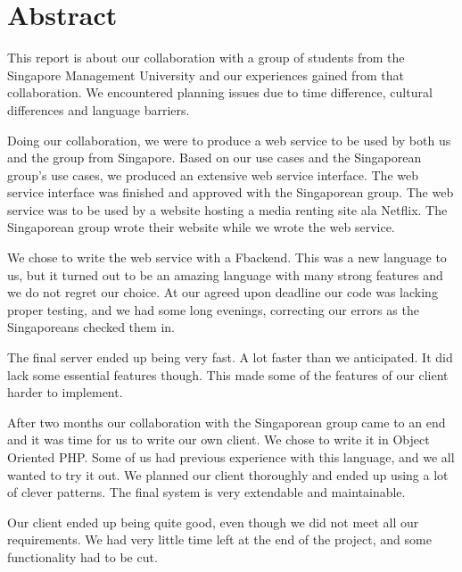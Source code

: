 \section*{Abstract}
This report is about our collaboration with a group of students from the Singapore Management University and our experiences gained from that collaboration. We encountered planning issues due to time difference, cultural differences and language barriers.

Doing our collaboration, we were to produce a web service to be used by both us and the group from Singapore. Based on our use cases and the Singaporean group's use cases, we produced an extensive web service interface. The web service interface was finished and approved with the Singaporean group.
The web service was to be used by a website hosting a media renting site ala Netflix. The Singaporean group wrote their website while we wrote the web service.

We chose to write the web service with a F\Sh backend. This was a new language to us, but it turned out to be an amazing language with many strong features and we do not regret our choice.
At our agreed upon deadline our code was lacking proper testing, and we had some long evenings, correcting our errors as the Singaporeans checked them in.

The final server ended up being very fast. A lot faster than we anticipated. It did lack some essential features though. This made some of the features of our client harder to implement.

After two months our collaboration with the Singaporean group came to an end and it was time for us to write our own client. We chose to write it in Object Oriented PHP. Some of us had previous experience with this language, and we all wanted to try it out. We planned our client thoroughly and ended up using a lot of clever patterns. The final system is very extendable and maintainable.

Our client ended up being quite good, even though we did not meet all our requirements. We had very little time left at the end of the project, and some functionality had to be cut.
\newpage